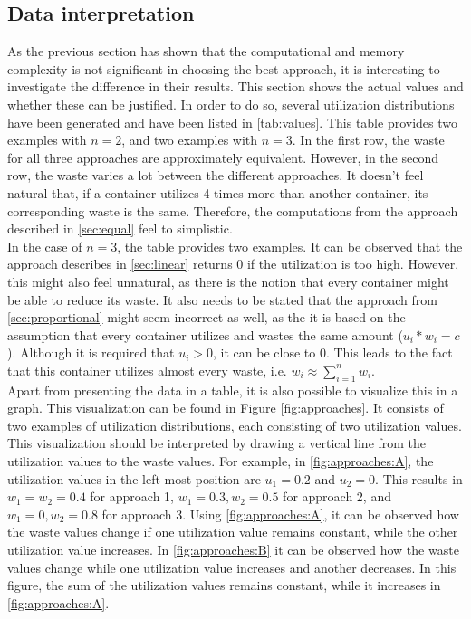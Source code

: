 \subsection{Data interpretation} \label{sec:data}
As the previous section has shown that the computational and memory complexity is not significant in choosing the best approach, it is interesting to investigate the difference in their results. This section shows the actual values and whether these can be justified. In order to do so, several utilization distributions have been generated and have been listed in \autoref{tab:values}. This table provides two examples with $n = 2$, and two examples with $n = 3$. In the first row, the waste for all three approaches are approximately equivalent. However, in the second row, the waste varies a lot between the different approaches. It doesn't feel natural that, if a container utilizes 4 times more than another container, its corresponding waste is the same. Therefore, the computations from the approach described in \autoref{sec:equal} feel to simplistic.\\

\noindent
In the case of $n = 3$, the table provides two examples. It can be observed that the approach describes in \autoref{sec:linear} returns $0$ if the utilization is too high. However, this might also feel unnatural, as there is the notion that every container might be able to reduce its waste. It also needs to be stated that the approach from \autoref{sec:proportional} might seem incorrect as well, as the it is based on the assumption that every container utilizes and wastes the same amount ($u_i * w_i = c$). Although it is required that $u_i > 0$, it can be close to $0$. This leads to the fact that this container utilizes almost every waste, i.e. $w_i \approx \sum_{i=1}^n w_i$.\\

\noindent
Apart from presenting the data in a table, it is also possible to visualize this in a graph. This visualization can be found in Figure \ref{fig:approaches}. It consists of two examples of utilization distributions, each consisting of two utilization values. This visualization should be interpreted by drawing a vertical line from the utilization values to the waste values. For example, in \autoref{fig:approaches:A}, the utilization values in the left most position are $u_1 = 0.2$ and $u_2 = 0$. This results in $w_1 = w_2 = 0.4$ for approach 1, $w_1 = 0.3, w_2 = 0.5$ for approach 2, and $w_1 = 0, w_2 = 0.8$ for approach 3. Using \autoref{fig:approaches:A}, it can be observed how the waste values change if one utilization value remains constant, while the other utilization value increases. In \autoref{fig:approaches:B} it can be observed how the waste values change while one utilization value increases and another decreases. In this figure, the sum of the utilization values remains constant, while it increases in \autoref{fig:approaches:A}.

